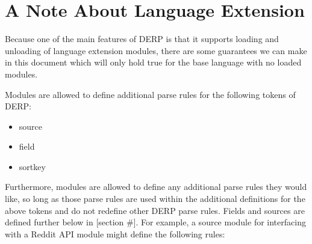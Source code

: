 \section{A Note About Language Extension}
\item Because one of the main features of DERP is that it supports loading and unloading
of language extension modules, there are some guarantees we can make in this document 
which will only hold true for the base language with no loaded modules.

Modules are allowed to define additional parse rules for the following tokens of DERP:
\begin{itemize}
\item source
\item field
\item sortkey
\end{itemize}
Furthermore, modules are allowed to define any additional parse rules they would like, so 
long as those parse rules are used within the additional definitions for the above tokens 
and do not redefine other DERP parse rules. Fields and sources are defined further below in [section #]. 
For example, a source module for interfacing with a Reddit API module might define the following rules:
\begin{center}
     \\
     \\
     \\
     \\
\end{center}